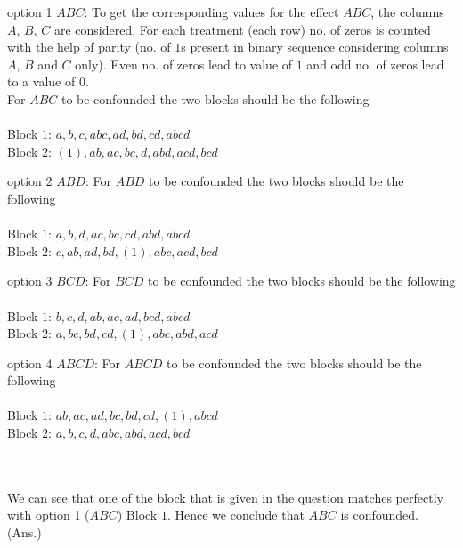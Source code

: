 \documentclass{article}
\theoremstyle{remark}
\begin{document}
\begin{paragraph}{option 1 $ABC$: }
    To get the corresponding values for the effect $ABC$, the columns $A$, $B$, $C$ are considered. For each treatment (each row) no. of zeros is counted with the help of parity (no. of $1$s present in binary sequence considering columns $A$, $B$ and $C$ only). Even no. of zeros lead to value of $1$ and odd no. of zeros lead to a value of $0$.\\
For $ABC$ to be confounded the two blocks should be the following\\ \\
Block $1$: $a,b,c,abc,ad,bd,cd,abcd$\\
Block $2$: $(1),ab,ac,bc,d,abd,acd,bcd$
\end{paragraph}
\begin{paragraph}{option 2 $ABD$: }
    For $ABD$ to be confounded the two blocks should be the following\\ \\    
    Block $1$: $a,b,d,ac,bc,cd,abd,abcd$ \\
    Block $2$: $c,ab,ad,bd,(1),abc,acd,bcd$ \\
\end{paragraph}

\begin{paragraph}{option 3 $BCD$: }
    For $BCD$ to be confounded the two blocks should be the following\\ \\    
    Block $1$: $b,c,d,ab,ac,ad,bcd,abcd$ \\
    Block $2$: $a,bc,bd,cd,(1),abc,abd,acd$ \\
\end{paragraph}

\begin{paragraph}{option 4 $ABCD$: }
    For $ABCD$ to be confounded the two blocks should be the following\\ \\    
    Block $1$: $ab,ac,ad,bc,bd,cd,(1),abcd$ \\
    Block $2$: $a,b,c,d,abc,abd,acd,bcd$ \\
\end{paragraph}
\\
\\
We can see that one of the block that is given in the question matches perfectly with option 1 ($ABC$) Block $1$. Hence we conclude that $ABC$ is confounded. (Ans.)
\end{document}
